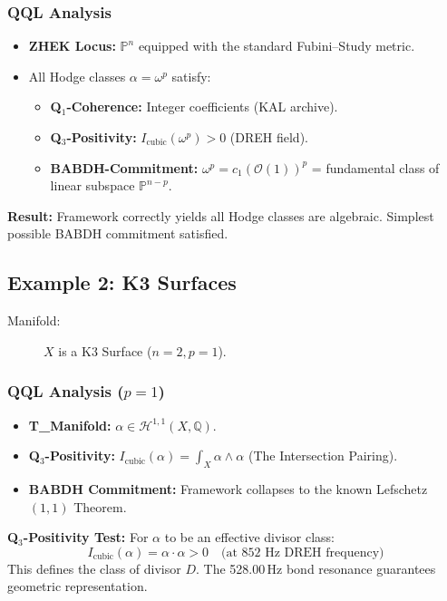 \documentclass[11pt, letterpaper]{article}
\newcommand{\KAL}{\ensuremath{\mathop{\textnormal{\symbolafont\symbol{"29C9}}}}}    %
\newcommand{\BABDH}{\ensuremath{\mathop{\textnormal{\symbolafont\symbol{"2316}}}}}   %
\newcommand{\DREH}{\ensuremath{\mathop{\textnormal{\symbolafont\symbol{"29D7}}}}}   %
\newcommand{\ZHEK}{\ensuremath{\mathop{\textnormal{\symbolafont\symbol{"25C8}}}}}   %
\def\KAL{KAL}%
\def\BABDH{BABDH}%
\def\DREH{DREH}%
\def\ZHEK{ZHEK}%
\begin{document}
\subsubsection*{QQL Analysis}
\begin{itemize}
    \item \textbf{\ZHEK{} Locus:} $\mathbb{P}^n$ equipped with the standard Fubini--Study metric.
    \item All Hodge classes $\alpha = \omega^p$ satisfy:
    \begin{itemize}
        \item \textbf{Q$_1$-Coherence:} Integer coefficients (\KAL{} archive).
        \item \textbf{Q$_3$-Positivity:} $I_{\text{cubic}}(\omega^p) > 0$ (\DREH{} field).
        \item \textbf{\BABDH-Commitment:} $\omega^p = c_1(\mathcal{O}(1))^p$ = fundamental class of linear subspace $\mathbb{P}^{n-p}$.
    \end{itemize}
\end{itemize}

\textbf{Result:} Framework correctly yields all Hodge classes are algebraic. Simplest possible \BABDH{} commitment satisfied.

\subsection{Example 2: K3 Surfaces}\label{sec:8.2}

\begin{description}
    \item[Manifold:] $X$ is a K3 Surface ($n=2, p=1$).
\end{description}

\subsubsection*{QQL Analysis ($p=1$)}\label{sec:8.2.1}
\begin{itemize}
    \item \textbf{T\_Manifold:} $\alpha \in \mathcal{H}^{1,1}(X, \mathbb{Q})$.
    \item \textbf{Q$_3$-Positivity:} $I_{\text{cubic}}(\alpha) = \int_X \alpha \wedge \alpha$ (The Intersection Pairing).
    \item \textbf{\BABDH{} Commitment:} Framework collapses to the known Lefschetz $(1,1)$ Theorem.
\end{itemize}

\textbf{Q$_3$-Positivity Test:}
For $\alpha$ to be an effective divisor class:
\[
I_{\text{cubic}}(\alpha) = \alpha \cdot \alpha > 0 \quad \text{(at 852 Hz \DREH{} frequency)}
\]
This defines the class of divisor $D$. The 528.00\,Hz bond resonance guarantees geometric representation.
\end{document}

